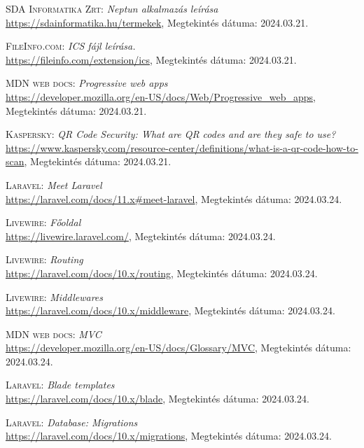 \documentclass[
]{thesis-ekf}
\theoremstyle{definition}
\theoremstyle{remark}
\begin{document}
\begin{thebibliography}{19}

\textsc{SDA Informatika Zrt:} \emph{Neptun alkalmazás leírása}
\\
\url{https://sdainformatika.hu/termekek}, Megtekintés dátuma: 2024.03.21.

\textsc{FileInfo.com}: \emph{ICS fájl leírása.}
\\
\url{https://fileinfo.com/extension/ics}, Megtekintés dátuma: 2024.03.21.

\textsc{MDN web docs}: \emph{Progressive web apps}
\\
\url{https://developer.mozilla.org/en-US/docs/Web/Progressive_web_apps}, Megtekintés dátuma: 2024.03.21.

\textsc{Kaspersky}: \emph{QR Code Security: What are QR codes and are they safe to use?}
\\
\url{https://www.kaspersky.com/resource-center/definitions/what-is-a-qr-code-how-to-scan}, Megtekintés dátuma: 2024.03.21.

\textsc{Laravel}: \emph{Meet Laravel}
\\
\url{https://laravel.com/docs/11.x#meet-laravel}, Megtekintés dátuma: 2024.03.24.

\textsc{Livewire}: \emph{Főoldal}
\\
\url{https://livewire.laravel.com/}, Megtekintés dátuma: 2024.03.24.

\textsc{Livewire}: \emph{Routing}
\\
\url{https://laravel.com/docs/10.x/routing}, Megtekintés dátuma: 2024.03.24.

\textsc{Livewire}: \emph{Middlewares}
\\
\url{https://laravel.com/docs/10.x/middleware}, Megtekintés dátuma: 2024.03.24.

\textsc{MDN web docs}: \emph{MVC}
\\
\url{https://developer.mozilla.org/en-US/docs/Glossary/MVC}, Megtekintés dátuma: 2024.03.24.

\textsc{Laravel}: \emph{Blade templates}
\\
\url{https://laravel.com/docs/10.x/blade}, Megtekintés dátuma: 2024.03.24.

\textsc{Laravel}: \emph{Database: Migrations}
\\
\url{https://laravel.com/docs/10.x/migrations}, Megtekintés dátuma: 2024.03.24.


\end{thebibliography}
\end{document}
